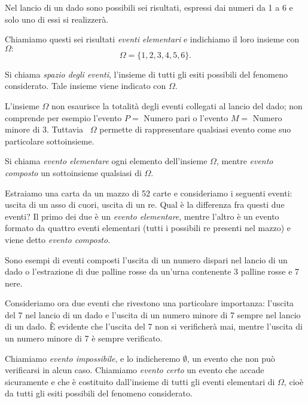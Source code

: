 Nel lancio di un dado sono possibili sei risultati, espressi dai numeri da 1 a 6 
e solo uno di essi si realizzerà.

Chiamiamo questi sei risultati \emph{eventi elementari} e indichiamo il loro 
insieme con 
$\Omega:$ 
\[\Omega =\{1,2,3,4,5,6\}.\]

\begin{definizione}
Si chiama \emph{spazio degli eventi}, l'insieme di tutti gli esiti possibili del 
fenomeno considerato. Tale insieme viene indicato con $\Omega $.
\end{definizione}

L'insieme $\Omega $ non esaurisce la totalità degli eventi collegati al lancio 
del dado; non comprende per esempio l'evento $P=$ Numero pari o l'evento $M=$ 
Numero minore di $3$. Tuttavia~ $\Omega $ permette di rappresentare qualsiasi 
evento come suo particolare sottoinsieme.

\begin{definizione}
Si chiama \emph{evento elementare} ogni elemento dell'insieme $\Omega$, mentre 
\emph{evento composto} un sottoinsieme qualsiasi di $\Omega$.
\end{definizione}

Estraiamo una carta da un mazzo di 52 carte e consideriamo i seguenti eventi: 
uscita di un asso di cuori, uscita di un re. Qual è la differenza fra questi due 
eventi? Il primo dei due è un \emph{evento elementare}, mentre l'altro è un 
evento formato da quattro eventi elementari (tutti i possibili re presenti nel 
mazzo) e viene detto \emph{evento composto}.

Sono esempi di eventi composti l'uscita di un numero dispari nel lancio di un 
dado o l'estrazione di due palline rosse da un'urna contenente 3 palline rosse e 
7 nere.

Consideriamo ora due eventi che rivestono una particolare importanza: l'uscita 
del 7 nel lancio di un dado e l'uscita di un numero minore di 7 sempre nel 
lancio di un dado. È evidente che l'uscita del 7 non si verificherà mai, mentre 
l'uscita di un numero minore di 7 è sempre verificato.

\begin{definizione}
Chiamiamo \emph{evento impossibile}, e lo indicheremo $\emptyset $, un evento 
che non può verificarsi in alcun caso.
Chiamiamo \emph{evento certo} un evento che accade sicuramente e che è 
costituito dall'insieme di tutti gli eventi elementari di $\Omega $, cioè da 
tutti gli esiti possibili del fenomeno considerato.
\end{definizione}

